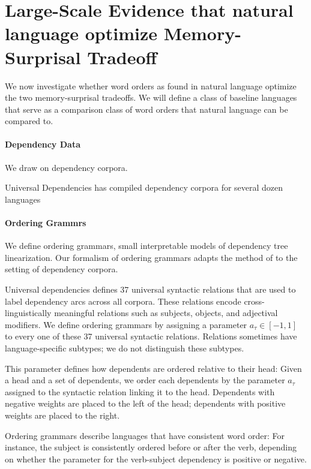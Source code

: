 \documentclass[11pt,letterpaper]{article}
\begin{document}
\section{Large-Scale Evidence that natural language optimize Memory-Surprisal Tradeoff}

We now investigate whether word orders as found in natural language optimize the two memory-surprisal tradeoffs.
We will define a class of baseline languages that serve as a comparison class of word orders that natural language can be compared to.



\paragraph{Dependency Data}
We draw on dependency corpora.

Universal Dependencies has compiled dependency corpora for several dozen languages



\paragraph{Ordering Grammrs}
We define ordering grammars, small interpretable models of dependency tree linearization.
Our formalism of ordering grammars adapts the method of \cite{gildea-optimizing-2007, gildea-grammars-2010, gildea-human-2015} to the setting of dependency corpora.

Universal dependencies defines 37 universal syntactic relations that are used to label dependency arcs across all corpora.
These relations encode cross-linguistically meaningful relations such as subjects, objects, and adjectival modifiers.
We define ordering grammars by assigning a parameter $a_\tau \in [-1,1]$ to every one of these 37 universal syntactic relations.
Relations sometimes have language-specific subtypes; we do not distinguish these subtypes.

This parameter defines how dependents are ordered relative to their head:
Given a head and a set of dependents, we order each dependents by the parameter $a_\tau$ assigned to the syntactic relation linking it to the head.
Dependents with negative weights are placed to the left of the head; dependents with positive weights are placed to the right.

Ordering grammars describe languages that have consistent word order:
For instance, the subject is consistently ordered before or after the verb, depending on whether the parameter for the verb-subject dependency is positive or negative.
\end{document}
